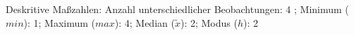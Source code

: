 				\label{tableValues:afin03}
				\vspace*{-\baselineskip}
                    \begin{noten}
                	    \note{} Deskritive Maßzahlen:
                	    Anzahl unterschiedlicher Beobachtungen: 4%
                	    ; 
                	      Minimum ($min$): 1; 
                	      Maximum ($max$): 4; 
                	      Median ($\tilde{x}$): 2; 
                	      Modus ($h$): 2
                     \end{noten}


